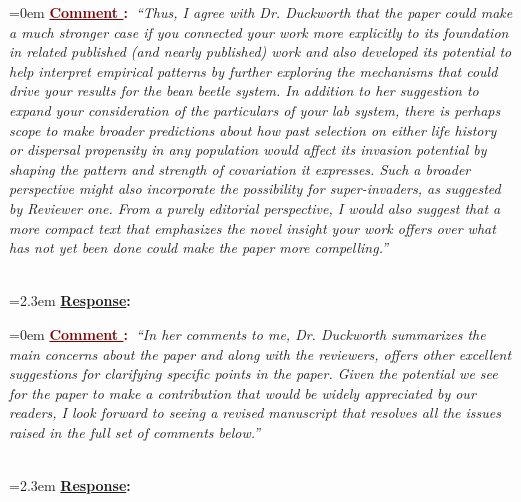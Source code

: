 \documentclass[12pt]{article}
\newcounter{cN}
\newcommand{\comment}[1]{
	\vspace{2em}
	\refstepcounter{cN} %
	\noindent \hangindent=0em \textbf{\textcolor{Maroon}{\uline{Comment \thecN}:~}}\emph{``#1''}
	}
\newcommand{\response}[1]{
	\\[0.25em]
	\hangindent=2.3em \textbf{\textcolor{NavyBlue}{\uline{Response}:~}}#1
	}
\begin{document}
\comment{Thus, I agree with Dr. Duckworth that the paper could make a much stronger case if you connected your work more explicitly to its foundation in related published (and nearly published) work and also developed its potential to help interpret empirical patterns by further exploring the mechanisms that could drive your results for the bean beetle system.
In addition to her suggestion to expand your consideration of the particulars of your lab system, there is perhaps scope to make broader predictions about how past selection on either life history or dispersal propensity in any population would affect its invasion potential by shaping the pattern and strength of covariation it expresses.
Such a broader perspective might also incorporate the possibility for super-invaders, as suggested by Reviewer one.
From a purely editorial perspective, I would also suggest that a more compact text that emphasizes the novel insight your work offers over what has not yet been done could make the paper more compelling.}
\response{}

\comment{In her comments to me, Dr. Duckworth summarizes the main concerns about the paper and along with the reviewers, offers other excellent suggestions for clarifying specific points in the paper.
Given the potential we see for the paper to make a contribution that would be widely appreciated by our readers, I look forward to seeing a revised manuscript that resolves all the issues raised in the full set of comments below.}
\response{}


%
%


\end{document}
